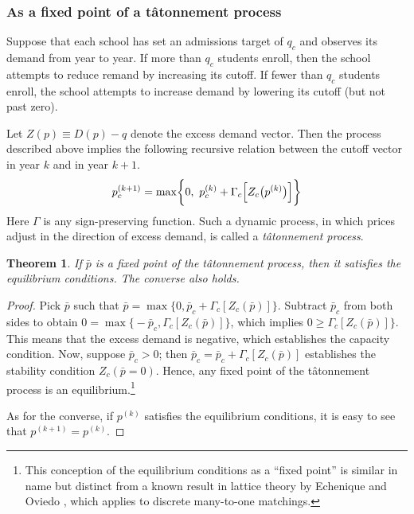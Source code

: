 \documentclass[12pt]{article}
\newtheorem{theorem}{Theorem}
\theoremstyle{definition}
\begin{document}
\subsubsection{As a fixed point of a t\^{a}tonnement process} \label{asafixedpoint}
Suppose that each school has set an admissions target of $q_c$ and observes its demand from year to year. If more than $q_c$ students enroll, then the school attempts to reduce remand by increasing its cutoff. If fewer than $q_c$ students enroll, the school attempts to increase demand by lowering its cutoff (but not past zero). 

Let $Z(p) \equiv D(p) - q$ denote the excess demand vector. Then the process described above implies the following recursive relation between the cutoff vector in year $k$ and in year $k+1$.
\begin{align} \label{tatonnementdef}
p_c^{(k+1)} = \max\biggl\{0,~p_c^{(k)}+ \Gamma_c\Bigl[Z_c\bigl(p^{(k)}\bigr)\Bigr] \biggr\}
\end{align}
Here $\Gamma$ is any sign-preserving function. Such a dynamic process, in which prices adjust in the direction of excess demand, is called a \emph{t\^{a}tonnement process}.
\begin{theorem}
If $\bar p$ is a fixed point of the t\^{a}tonnement process, then it satisfies the equilibrium conditions. The converse also holds.
\end{theorem}
\begin{proof} Pick $\bar p$ such that $\bar p = \max\bigl\{0, \bar p_c + \Gamma_c\left[Z_c(\bar p)\right] \bigr\}$. Subtract $\bar p_c$ from both sides to obtain $0 = \max\bigl\{-\bar p_c,\Gamma_c\left[Z_c(\bar p)\right] \bigr\}$, which implies $0 \geq \Gamma_c\left[Z_c(\bar p)\right] \bigr\}$. This means that the excess demand is negative, which establishes the capacity condition. Now, suppose $\bar p_c > 0$; then $\bar p_c =  \bar p_c + \Gamma_c\left[Z_c(\bar p)\right] $ establishes the stability condition $Z_c(\bar p = 0)$. Hence, any fixed point of the t\^{a}tonnement process is an equilibrium.\footnote{This conception of the equilibrium conditions as a ``fixed point'' is similar in name but distinct from a known result in lattice theory by Echenique and Oviedo \parencite*{coremanytoonebyfixedpoint}, which applies to discrete many-to-one matchings.}

As for the converse, if $p^{(k)}$ satisfies the equilibrium conditions, it is easy to see that $p^{(k+1)} = p^{(k)}$. \end{proof}
\end{document}
